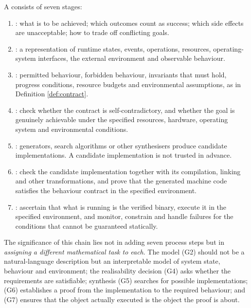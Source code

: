 \begin{definition}\label{def:chain}
A  consists of seven stages:
\begin{enumerate}[label=(G\arabic*)]
\item {}: what is to be achieved; which outcomes count as success;
      which side effects are unacceptable; how to trade off conflicting goals.
\item {}: a representation of runtime states, events,
      operations, resources, operating-system interfaces, the external environment and
      observable behaviour.
\item {}: permitted behaviour, forbidden behaviour,
      invariants that must hold, progress conditions, resource budgets and environmental
      assumptions, as in Definition \ref{def:contract}.
\item {}: check whether the contract is self-contradictory, and
      whether the goal is genuinely achievable under the specified resources, hardware,
      operating system and environmental conditions.
\item {}: generators, search algorithms or other
      synthesisers produce candidate implementations. A candidate implementation is not
      trusted in advance.
\item {}: check the candidate
      implementation together with its compilation, linking and other transformations, and
      prove that the generated machine code satisfies the behaviour contract in the
      specified environment.
\item {}: ascertain that what is running is
      the verified binary, execute it in the specified environment, and monitor, constrain
      and handle failures for the conditions that cannot be guaranteed statically.
\end{enumerate}
\end{definition}

The significance of this chain lies not in adding seven process steps but in \emph{assigning
a different mathematical task to each}. The model (G2) should not be a natural-language
description but an interpretable model of system state, behaviour and environment; the
realisability decision (G4) asks whether the requirements are satisfiable; synthesis (G5)
searches for possible implementations; (G6) establishes a proof from the implementation to
the required behaviour; and (G7) ensures that the object actually executed is the object the
proof is about.

